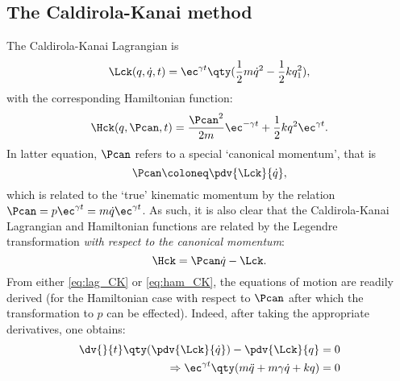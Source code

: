 \subsection{The Caldirola-Kanai method}
\label{ssec:caldirola}
The Caldirola-Kanai Lagrangian is
\begin{equation}
    \Lck(q, \dot{q}, t) = \ec^{\gamma t}\qty(\frac{1}{2}m\dot{q}^2 - \frac{1}{2}kq_1^2),
    \label{eq:lag_CK}
\end{equation}
with the corresponding Hamiltonian function:
\begin{equation}
    \Hck(q, \Pcan, t) = \frac{\Pcan^2}{2m}\ec^{-\gamma t} + \frac{1}{2}kq^2\ec^{\gamma t}.
    \label{eq:ham_CK}
\end{equation}
In latter equation, $\Pcan$ refers to a special `canonical momentum', that is
\begin{equation}
    \Pcan \coloneq \pdv{\Lck}{\dot{q}},
    \label{eq:can_momentum}
\end{equation}
which is related to the `true' kinematic momentum by the relation $\Pcan = p\ec^{\gamma
t} = m\dot{q}\ec^{\gamma t}$. As such, it is also clear that the Caldirola-Kanai Lagrangian and Hamiltonian functions are related by the Legendre transformation \emph{with respect to the canonical momentum}:
$$ \Hck = \Pcan \dot{q} - \Lck. $$
From either \cref{eq:lag_CK} or \cref{eq:ham_CK}, the equations of motion are readily
derived (for the Hamiltonian case with respect to $\Pcan$ after which the transformation to $p$ can be effected).
Indeed, after taking the appropriate derivatives, one obtains:
\begin{equation*} 
    \begin{split}
        \dv{}{t}\qty(\pdv{\Lck}{\dot{q}}) - \pdv{\Lck}{q} &= 0 \\
        \Rightarrow \ec^{\gamma t}\qty(m\ddot{q} + m\gamma\dot{q} + kq) &= 0
    \end{split}
\end{equation*}
